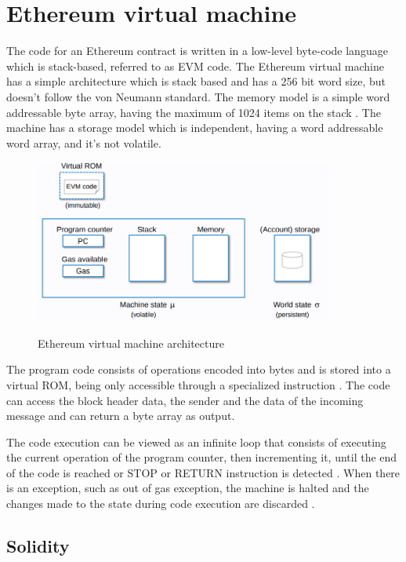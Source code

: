 \documentclass[
    article, 
    12pt,				%
	oneside,			%
	a4paper,			%
	chapter=TITLE,		%
	section=TITLE,		%
	english,			%
	english,				%
	sumario=tradicional
]{abntex2}
\begin{document}
\section{Ethereum virtual machine}

The code for an Ethereum contract is written in a low-level byte-code language which is stack-based, referred to as EVM code.
The Ethereum virtual machine has a simple architecture which is stack based and has a 256 bit word size, but doesn't follow the von Neumann standard.
The memory model is a simple word addressable byte array, having the maximum of 1024 items on the stack \cite{wood_ethereum_2021}.
The machine has a storage model which is independent, having a word addressable word array, and it's not volatile.

\begin{figure}[ht]
    \centering
    \caption{Ethereum virtual machine architecture}
    \includegraphics[width=370px]{images/evm_architecture.png}
    \label{fig:evm_architecture}
\end{figure}

The program code consists of operations encoded into bytes and is stored into a virtual ROM, being only accessible through a specialized instruction \cite{wood_ethereum_2021}.
The code can access the block header data, the sender and the data of the incoming message and can return a byte array as output.

The code execution can be viewed as an infinite loop that consists of executing the current operation of the program counter, then incrementing it, until the end of the code is reached or STOP or RETURN instruction is detected \cite{buterin_eth_whitepaper_2013}.
When there is an exception, such as out of gas exception, the machine is halted and the changes made to the state during code execution are discarded \cite{wood_ethereum_2021}.

\subsection{Solidity}
\end{document}
